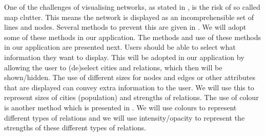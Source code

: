 One of the challenges of visualising networks, as stated in \cite{468391}, is the risk of so called map clutter. This means the network is displayed as an incomprehensible set of lines and nodes.
Several methods to prevent this are given in \cite{468391}. We will adopt some of these methods in our application. The methods and use of these methods in our application are presented next.
Users should be able to select what information they want to display. This will be adopted in our application by allowing the user to (de)select cities and relations, which then will be shown/hidden. The use of different sizes for nodes and edges or other attributes that are displayed can convey extra information to the user. We will use this to represent sizes of cities (population) and strengths of relations.
The use of colour is another method which is presented in \cite{468391}. We will use colours to represent different types of relations and we will use intensity/opacity to represent the strengths of these different types of relations.